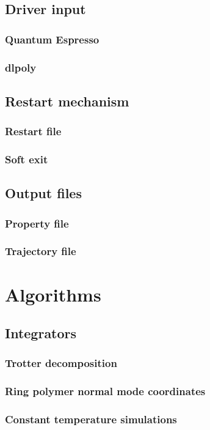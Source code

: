 \documentclass[12pt,fleqn]{report}
\begin{document}
\section{Driver input}
\subsection{Quantum Espresso}
\subsection{dlpoly}
\section{Restart mechanism}
\subsection{Restart file}
\subsection{Soft exit}
\section{Output files}
\subsection{Property file}
\subsection{Trajectory file}

\chapter{Algorithms}
\section{Integrators}
\subsection{Trotter decomposition}
\subsection{Ring polymer normal mode coordinates}
\subsection{Constant temperature simulations}
\end{document}
